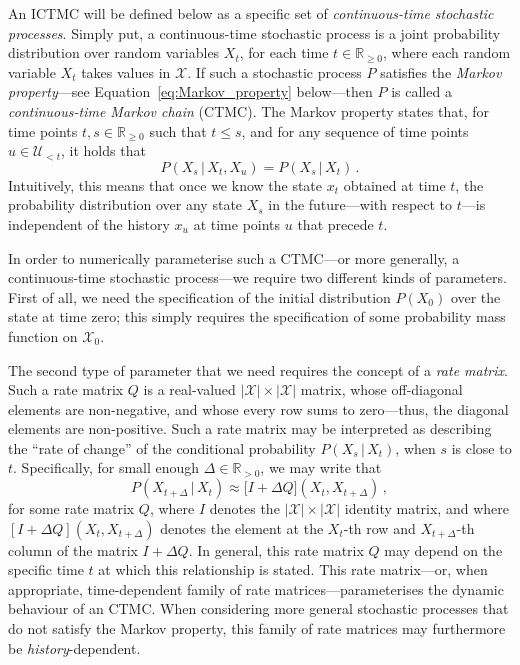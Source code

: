 \documentclass[twoside,11pt]{article}
\newcommand{\reals}{\mathbb{R}}
\newcommand{\realspos}{\reals_{>0}}
\newcommand{\realsnonneg}{\reals_{\geq 0}}
\newcommand{\states}{\mathcal{X}}
\begin{document}
An ICTMC will be defined below as a specific set of \emph{continuous-time stochastic processes}. Simply put, a continuous-time stochastic process is a joint probability distribution over random variables $X_t$, for each time $t\in\realsnonneg$, where each random variable $X_t$ takes values in $\states$. If such a stochastic process $P$ satisfies the \emph{Markov property}---see Equation~\eqref{eq:Markov_property} below---then $P$ is called a \emph{continuous-time Markov chain} (CTMC). The Markov property states that, for time points $t,s\in\realsnonneg$ such that $t\leq s$, and for any sequence of time points $u\in\mathcal{U}_{<t}$, it holds that
\begin{equation}\label{eq:Markov_property}
P(X_s\,\vert\,X_t,X_u) = P(X_s\,\vert\,X_t)\,.
\end{equation}
Intuitively, this means that once we know the state $x_t$ obtained at time $t$, the probability distribution over any state $X_s$ in the future---with respect to $t$---is independent of the history $x_u$ at time points $u$ that precede $t$.

In order to numerically parameterise such a CTMC---or more generally, a continuous-time stochastic process---we require two different kinds of parameters. First of all, we need the specification of the initial distribution $P(X_0)$ over the state at time zero; this simply requires the specification of some probability mass function on $\states_0$.

The second type of parameter that we need requires the concept of a \emph{rate matrix}. Such a rate matrix $Q$ is a real-valued $\lvert\states\rvert\times\lvert\states\rvert$ matrix, whose off-diagonal elements are non-negative, and whose every row sums to zero---thus, the diagonal elements are non-positive. Such a rate matrix may be interpreted as describing the ``rate of change'' of the conditional probability $P(X_s\,\vert\,X_t)$, when $s$ is close to $t$. Specifically, for small enough $\Delta\in\realspos$, we may write that
\begin{equation*}
P(X_{t+\Delta}\,\vert\,X_t) \approx \bigl[I + \Delta Q\bigr](X_t, X_{t+\Delta})\,,
\end{equation*}
for some rate matrix $Q$, where $I$ denotes the $\lvert\states\rvert\times\lvert\states\rvert$ identity matrix, and where $[I + \Delta Q](X_t,X_{t+\Delta})$ denotes the element at the $X_t$-th row and $X_{t+\Delta}$-th column of the matrix $I + \Delta Q$. In general, this rate matrix $Q$ may depend on the specific time $t$ at which this relationship is stated. This rate matrix---or, when appropriate, time-dependent family of rate matrices---parameterises the dynamic behaviour of an CTMC. When considering more general stochastic processes that do not satisfy the Markov property, this family of rate matrices may furthermore be \emph{history}-dependent.
\end{document}
